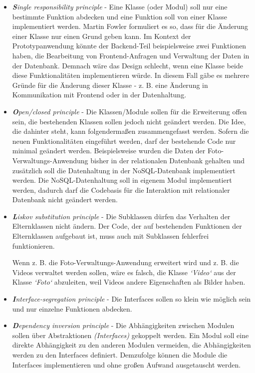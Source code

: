 \begin{itemize}

\item \textit{\textbf{S}ingle responsibility principle} - Eine Klasse (oder Modul) soll nur eine bestimmte Funktion abdecken und eine Funktion soll von einer Klasse implementiert werden. Martin Fowler formuliert es so, dass für die Änderung einer Klasse nur einen Grund geben kann. Im Kontext der Prototypanwendung könnte der Backend-Teil beispielsweise zwei Funktionen haben, die Bearbeitung von Frontend-Anfragen und Verwaltung der Daten in der Datenbank. Demnach wäre das Design schlecht, wenn eine Klasse beide diese Funktionalitäten implementieren würde. In diesem Fall gäbe es mehrere Gründe für die Änderung dieser Klasse - z. B. eine Änderung in Kommunikation mit Frontend oder in der Datenhaltung.

\item \textit{\textbf{O}pen/closed principle} - Die Klassen/Module sollen für die Erweiterung offen sein, die bestehenden Klassen sollen jedoch nicht geändert werden. Die Idee, die dahinter steht, kann folgendermaßen zusammengefasst werden. Sofern die neuen Funktionalitäten eingeführt werden, darf der bestehende Code nur minimal geändert werden. Beispielsweise wurden die Daten der Foto-Verwaltungs-Anwendung bisher in der relationalen Datenbank gehalten und zusätzlich soll die Datenhaltung in der NoSQL-Datenbank implementiert werden. Die NoSQL-Datenhaltung soll in eigenem Modul implementiert werden, dadurch darf die Codebasis für die Interaktion mit relationaler Datenbank nicht geändert werden. 

\item \textit{\textbf{L}iskov substitution principle} - Die Subklassen dürfen das Verhalten der Elternklassen nicht ändern. Der Code, der auf bestehenden Funktionen der Elternklassen aufgebaut ist, muss auch mit Subklassen fehlerfrei funktionieren.

Wenn z. B. die Foto-Verwaltungs-Anwendung erweitert wird und z. B. die Videos verwaltet werden sollen, wäre es falsch, die Klasse \textit{`Video`} aus der Klasse \textit{`Foto`} abzuleiten, weil Videos andere Eigenschaften als Bilder haben.

\item \textit{\textbf{I}nterface-segregation principle} - Die Interfaces sollen so klein wie möglich sein und nur einzelne Funktionen abdecken.

\item \textit{\textbf{D}ependency inversion principle} - Die Abhängigkeiten zwischen Modulen sollen über Abstraktionen \textit{(Interfaces)} gekoppelt werden. Ein Modul soll eine direkte Abhängigkeit zu den anderen Modulen vermeiden, die Abhängigkeiten werden zu den Interfaces definiert. Demzufolge können die Module die Interfaces implementieren und ohne großen Aufwand ausgetauscht werden. 


\end{itemize}

